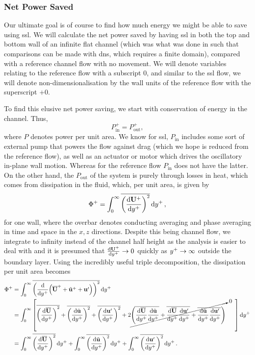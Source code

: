 \subsubsection{Net Power Saved}
Our ultimate goal is of course to find how much energy we might be able to save using \gls{ssl}. We will calculate the net power saved by having \gls{ssl} in both the top and bottom wall of an infinite flat channel (which was what was done in \textcite{viotti2009} such that comparisons can be made with \gls{dns}, which requires a finite domain), compared with a reference channel flow with no movement. We will denote variables relating to the reference flow with a subscript 0, and similar to the \gls{ssl} flow, we will denote non-dimensionalisation by the wall units of the reference flow with the superscript $+0$.

To find this elusive net power saving, we start with conservation of energy in the channel. Thus,
\begin{equation}
	P_\text{in}^{+}=P_\text{out}^{+}
,\end{equation}
where $P$ denotes power per unit area. We know for \gls{ssl}, $P_\text{in} $ includes some sort of external pump that powers the flow against drag (which we hope is reduced from the reference flow), as well as an actuator or motor which drives the oscillatory in-plane wall motion. Whereas for the reference flow $P_\text{in} $ does not have the latter. On the other hand, the $P_\text{out} $ of the system is purely through losses in heat, which comes from dissipation in the fluid, which, per unit area, is given by
\begin{equation}
	\Phi ^{+}=\int_{0}^{\infty} \overline{\left( \dv{\mathbf{U} \ensuremath{^{+}}}{y\ensuremath{^{+}}}  \right) ^2}  \dd{y\ensuremath{^{+}}} 
,\end{equation}
for one wall, where the overbar denotes conducting averaging and phase averaging in time and space in the $x,z$ directions. Despite this being channel flow, we integrate to infinity instead of the channel half height as the analysis is easier to deal with and it is presumed that $\dv{\mathbf{U}\ensuremath{^{+}}}{y\ensuremath{^{+}}} \to0$ quickly as $y^{+}\to\infty$ outside the boundary layer. Using the incredibly useful triple decomposition, the dissipation per unit area becomes
\begin{align}
	\Phi ^{+}&=\int_{0}^{\infty} \overline{\left( \dv{y\ensuremath{^{+}}}(\overline{\mathbf{U}} ^{+} + \tilde{\mathbf{u} }^{+} + \mathbf{u'} )  \right) ^2}  \dd{y\ensuremath{^{+}}}\\ 
		 &=\int_{0}^{\infty} \left[ \overline{\left( \dv{\overline{\mathbf{U} }}{y\ensuremath{^{+}}}  \right) ^2}+\overline{\left( \dv{\tilde{\mathbf{u} }}{y\ensuremath{^{+}}}  \right) ^2} + \overline{\left(\dv{\mathbf{u'} }{y\ensuremath{^{+}}}\right) ^2} + 2\cancelto{0}{\left( \overline{\dv{ \overline{\mathbf{U} }}{y\ensuremath{^{+}}}\dv{ \tilde{\mathbf{u} }}{y\ensuremath{^{+}}} } + \overline{\dv{ \overline{\mathbf{U} }}{y\ensuremath{^{+}}}\dv{\mathbf{u'} }{y\ensuremath{^{+}}} } + \overline{\dv{ \tilde{\mathbf{u} }}{y\ensuremath{^{+}}}\dv{\mathbf{u'}}{y\ensuremath{^{+}}} } \right)}\phantom{--} \right] \dd{y\ensuremath{^{+}}} \label{eq:dissdisappear}  \\
		 &=\int_{0}^{\infty}  \overline{\left( \dv{\overline{\mathbf{U} }}{y\ensuremath{^{+}}}  \right) ^2}\dd{y\ensuremath{^{+}}}+\int_{0}^{\infty}  \overline{\left( \dv{\tilde{\mathbf{u} }}{y\ensuremath{^{+}}}  \right) ^2} \dd{y\ensuremath{^{+}}} + \int_{0}^{\infty}  \overline{\left(\dv{\mathbf{u'} }{y\ensuremath{^{+}}}\right) ^2} \dd{y\ensuremath{^{+}}}
.\end{align}
